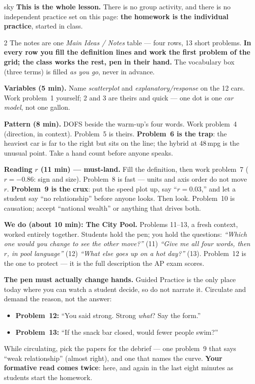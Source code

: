 \documentclass[10pt]{article}
\begin{document}
\boxguard[30]
\begin{skillbox}{sky}
\textbf{This is the whole lesson.} There is no group activity, and there is no independent
practice set on this page: \textbf{the homework is the individual practice}, started in class.
\begin{multicols}{2}
The notes are one \emph{Main Ideas / Notes} table --- four rows, 13 short problems.
\textbf{In every row you fill the definition lines and work the first problem of the grid; the
class works the rest, pen in their hand.} The vocabulary box (three terms) is filled \emph{as
you go}, never in advance.

\textbf{Variables (5 min).} Name \emph{scatterplot} and \emph{explanatory/response} on the 12
cars. Work problem~1 yourself; 2 and 3 are theirs and quick --- one dot is one \emph{car model},
not one gallon.

\textbf{Pattern (8 min).} DOFS beside the warm-up's four words. Work problem~4 (direction, in
context). Problem~5 is theirs. \textbf{Problem~6 is the trap}: the heaviest car is far to the
right but sits on the line; the hybrid at 48\,mpg is the unusual point. Take a hand count
before anyone speaks.

\textbf{Reading $r$ (11 min) --- must-land.} Fill the definition, then work problem~7
($r = -0.86$: sign and size). Problem~8 is fast --- units and axis order do not move $r$.
\textbf{Problem~9 is the crux}: put the speed plot up, say ``$r = 0.03$,'' and let a student
say ``no relationship'' before anyone looks. Then look. Problem~10 is causation; accept
``national wealth'' or anything that drives both.

\columnbreak
\textbf{We do (about 10 min): The City Pool.} Problems 11--13, a fresh context, worked
entirely together. Students hold the pen; you hold the questions: \emph{``Which one would you
change to see the other move?''} (11) \quad \emph{``Give me all four words, then $r$, in pool
language''} (12) \quad \emph{``What else goes up on a hot day?''} (13). Problem~12 is the one to
protect --- it is the full description the AP exam scores.

\textbf{The pen must actually change hands.} Guided Practice is the only place today where you
can watch a student decide, so do not narrate it. Circulate and demand the reason, not the
answer:
\begin{itemize}[leftmargin=1.1em, nosep]
  \item \textbf{Problem~12:} ``You said strong. Strong \emph{what}? Say the form.''
  \item \textbf{Problem~13:} ``If the snack bar closed, would fewer people swim?''
\end{itemize}
While circulating, pick the papers for the debrief --- one problem~9 that says ``weak
relationship'' (almost right), and one that names the curve. \textbf{Your formative read comes
twice}: here, and again in the last eight minutes as students start the homework.
\end{multicols}
\end{skillbox}
\end{document}
